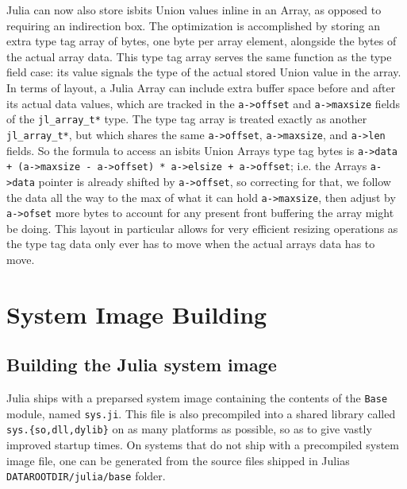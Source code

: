 Julia can now also store {\textquotedbl}isbits Union{\textquotedbl} values inline in an Array, as opposed to requiring an indirection box. The optimization is accomplished by storing an extra {\textquotedbl}type tag array{\textquotedbl} of bytes, one byte per array element, alongside the bytes of the actual array data. This type tag array serves the same function as the type field case: its value signals the type of the actual stored Union value in the array. In terms of layout, a Julia Array can include extra {\textquotedbl}buffer{\textquotedbl} space before and after its actual data values, which are tracked in the \texttt{a->offset} and \texttt{a->maxsize} fields of the \texttt{jl\_array\_t*} type. The {\textquotedbl}type tag array{\textquotedbl} is treated exactly as another \texttt{jl\_array\_t*}, but which shares the same \texttt{a->offset}, \texttt{a->maxsize}, and \texttt{a->len} fields. So the formula to access an isbits Union Array{\textquotesingle}s type tag bytes is \texttt{a->data + (a->maxsize - a->offset) * a->elsize + a->offset}; i.e. the Array{\textquotesingle}s \texttt{a->data} pointer is already shifted by \texttt{a->offset}, so correcting for that, we follow the data all the way to the max of what it can hold \texttt{a->maxsize}, then adjust by \texttt{a->ofset} more bytes to account for any present {\textquotedbl}front buffering{\textquotedbl} the array might be doing. This layout in particular allows for very efficient resizing operations as the type tag data only ever has to move when the actual array{\textquotesingle}s data has to move.



\hypertarget{6450179845418792741}{}


\section{System Image Building}



\hypertarget{2889722918811470983}{}


\subsection{Building the Julia system image}



Julia ships with a preparsed system image containing the contents of the \texttt{Base} module, named \texttt{sys.ji}.  This file is also precompiled into a shared library called \texttt{sys.\{so,dll,dylib\}} on as many platforms as possible, so as to give vastly improved startup times.  On systems that do not ship with a precompiled system image file, one can be generated from the source files shipped in Julia{\textquotesingle}s \texttt{DATAROOTDIR/julia/base} folder.



